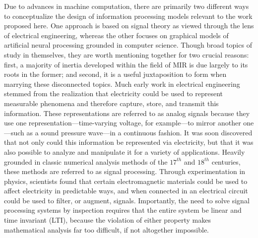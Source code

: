 Due to advances in machine computation, there are primarily two different ways to conceptualize the design of information processing models relevant to the work proposed here.
One approach is based on signal theory as viewed through the lens of electrical engineering, whereas the other focuses on graphical models of artificial neural processing grounded in computer science.
Though broad topics of study in themselves, they are worth mentioning together for two crucial reasons: first, a majority of inertia developed within the field of MIR is due largely to its roots in the former; and second, it is a useful juxtaposition to form when marrying these disconnected topics.
Much early work in electrical engineering stemmed from the realization that electricity could be used to represent measurable phenomena and therefore capture, store, and transmit this information.
These representations are referred to as analog signals because they use one representation---time-varying voltage, for example---to mirror another one---such as a sound pressure wave---in a continuous fashion.
It was soon discovered that not only could this information be represented via electricity, but that it was also possible to analyze and manipulate it for a variety of applications.
Heavily grounded in classic numerical analysis methods of the $17^{th}$ and $18^{th}$ centuries, these methods are referred to as signal processing.
Through experimentation in physics, scientists found that certain electromagnetic materials could be used to affect electricity in predictable ways, and when connected in an electrical circuit could be used to filter, or augment, signals.
Importantly, the need to solve signal processing systems by inspection requires that the entire system be linear and time invariant (LTI), because the violation of either property makes mathematical analysis far too difficult, if not altogether impossible.

